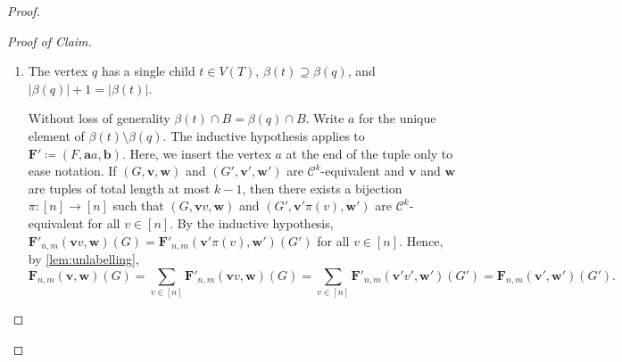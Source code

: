 \documentclass[11pt, DIV=15]{scrarticle}
\theoremstyle{definition}
\theoremstyle{plain}
\theoremstyle{remark}
\newenvironment{claimproof}[1][Proof of Claim]{\begin{proof}[#1] \renewcommand{\qedsymbol}{$\lrcorner$}}{ \end{proof}}
\begin{document}
\begin{proof}
\begin{claimproof}
\begin{enumerate}
				Define $F'$ as the subgraph of $F$ induced by $\bigcup_{s \in V(T) \setminus \{q\}} \beta(s)$.
				Suppose without loss of generality that $\beta(q) \cap B = \beta(t) \cap B$.
				Let $i \in [\ell]$ be such that $a_i \not\in \beta(t)$.
				Then $\boldsymbol{F}' \coloneqq (F', \boldsymbol{a}[i/], \boldsymbol{b})$ is a graph to which the inductive hypothesis applies.
				
				If $(G, \boldsymbol{v}, \boldsymbol{w})$ and $(G', \boldsymbol{v}', \boldsymbol{w}')$ are $\mathcal{C}^k$-equivalent,
				then so are $(G, \boldsymbol{v}[i/], \boldsymbol{w})$ and $(G', \boldsymbol{v}'[i/], \boldsymbol{w}')$.
				By the inductive hypothesis,
				$\boldsymbol{F}'_{n,m}(\boldsymbol{v}[i/], \boldsymbol{w})(G) = \boldsymbol{F}'_{n,m}(\boldsymbol{v}'[i/], \boldsymbol{w}')(G')$.

				Now $\boldsymbol{F}$ differs from $\boldsymbol{F}'$ only in the vertex $a_i$ and the potential edges connecting $a_i$ to the vertices in $\boldsymbol{b}$.
				More precisely,
				\[
					\boldsymbol{F}_{n,m}(\boldsymbol{v}, \boldsymbol{w})(G)
					= \boldsymbol{F}'_{n,m}(\boldsymbol{v}[i/], \boldsymbol{w})(G) \cdot \prod_{a_ib_j \in E(F)} G(v_i w_j).
				\]
				Since $(G, \boldsymbol{v}, \boldsymbol{w})$ and $(G', \boldsymbol{v}', \boldsymbol{w}')$ are $\mathcal{C}^k$-equivalent, $G(v_i w_j) = G'(v'_i w'_j)$ for all $i \in [\ell]$ and $j \in [r]$.
				This implies the claim.
				
				\item The vertex $q$ has a single child $t \in V(T)$, $\beta(t) \supseteq \beta(q)$, and $|\beta(q)|+1 = |\beta(t)|$.
				
				Without loss of generality $\beta(t) \cap B = \beta(q) \cap B$. Write $a$ for the unique element of $\beta(t) \setminus \beta(q)$. 
				The inductive hypothesis applies to $\boldsymbol{F}' \coloneqq (F, \boldsymbol{a}a, \boldsymbol{b})$.
				Here, we insert the vertex $a$ at the end of the tuple only to ease notation.
				If  $(G, \boldsymbol{v}, \boldsymbol{w})$ and $(G', \boldsymbol{v}', \boldsymbol{w}')$ are $\mathcal{C}^k$-equivalent and $\boldsymbol{v}$ and $\boldsymbol{w}$ are tuples of total length at most $k-1$,
				then there exists a bijection $\pi \colon [n] \to [n]$ such that 
				$(G, \boldsymbol{v}v, \boldsymbol{w})$ and $(G', \boldsymbol{v}'\pi(v), \boldsymbol{w}')$ are $\mathcal{C}^k$-equivalent for all $v \in [n]$.
				By the inductive hypothesis,
				$\boldsymbol{F}'_{n,m}(\boldsymbol{v}v, \boldsymbol{w})(G) = \boldsymbol{F}'_{n,m}(\boldsymbol{v}'\pi(v), \boldsymbol{w}')(G')$ for all $v \in [n]$.
				Hence, by \cref{lem:unlabelling},
				\[
					\boldsymbol{F}_{n,m}(\boldsymbol{v}, \boldsymbol{w})(G)	
					= \sum_{v \in [n]} \boldsymbol{F}'_{n,m}(\boldsymbol{v}v, \boldsymbol{w})(G)	
					= \sum_{v \in [n]} \boldsymbol{F}'_{n,m}(\boldsymbol{v}'v', \boldsymbol{w}')(G')
					= 	\boldsymbol{F}_{n,m}(\boldsymbol{v}', \boldsymbol{w}')(G').	
				\]
				

\end{enumerate}
\end{claimproof}
\end{proof}
\end{document}
